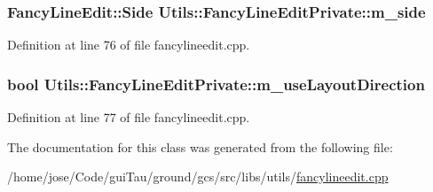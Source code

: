 \hypertarget{class_utils_1_1_fancy_line_edit_private_ad60d06ba3fb014847644f73c494245b0}{
\subsubsection[{m\-\_\-side}]{\setlength{\rightskip}{0pt plus 5cm}Fancy\-Line\-Edit\-::\-Side Utils\-::\-Fancy\-Line\-Edit\-Private\-::m\-\_\-side}}\label{class_utils_1_1_fancy_line_edit_private_ad60d06ba3fb014847644f73c494245b0}


Definition at line 76 of file fancylineedit.\-cpp.

\hypertarget{class_utils_1_1_fancy_line_edit_private_a54c91966247b6fded6bf5740e658e9ea}{
\subsubsection[{m\-\_\-use\-Layout\-Direction}]{\setlength{\rightskip}{0pt plus 5cm}bool Utils\-::\-Fancy\-Line\-Edit\-Private\-::m\-\_\-use\-Layout\-Direction}}\label{class_utils_1_1_fancy_line_edit_private_a54c91966247b6fded6bf5740e658e9ea}


Definition at line 77 of file fancylineedit.\-cpp.



The documentation for this class was generated from the following file\-:\begin{DoxyCompactItemize}
\item 
/home/jose/\-Code/gui\-Tau/ground/gcs/src/libs/utils/\hyperlink{fancylineedit_8cpp}{fancylineedit.\-cpp}\end{DoxyCompactItemize}
